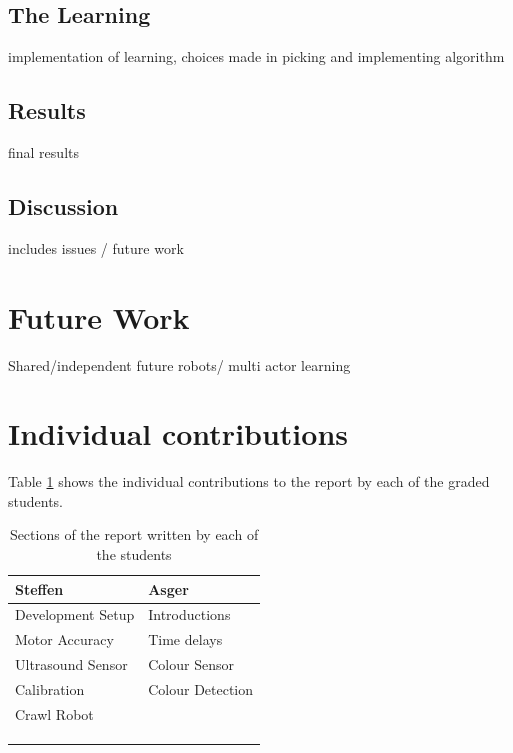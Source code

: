 \documentclass[11pt, a4paper]{article}
\begin{document}
\subsection{The Learning}
implementation of learning, choices made in picking and implementing algorithm
\subsection{Results}
final results
\subsection{Discussion}
includes issues / future work

\section{Future Work}
Shared/independent
future robots/  multi actor learning

\section{Individual contributions}
Table \ref{tab:contributions} shows the individual contributions to the report by each of the graded students.
\begin{table}[H]
	\centering
	\begin{tabular}{l|l}
		Steffen & Asger \\ \hline
		Development Setup & Introductions\\
		Motor Accuracy & Time delays\\
		Ultrasound Sensor & Colour Sensor\\
		Calibration & Colour Detection\\
        Crawl Robot & \\
	     & \\
	     & \\
	     & \\
     
		      
	\end{tabular}
	\caption{Sections of the report written by each of the students}
	\label{tab:contributions}
\end{table}




\end{document}
